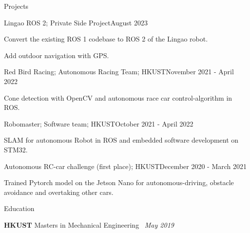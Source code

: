 \documentclass[
	a4paper, %
	11pt, %
]{resume} %
\begin{document}
\begin{rSection}{Projects}

	\begin{rSubsection}{Lingao ROS 2; Private Side Project}{August 2023}{}{}
		\item Convert the existing ROS 1 codebase to ROS 2 of the Lingao robot.
		\item Add outdoor navigation with GPS.
	\end{rSubsection}


	\begin{rSubsection}{Red Bird Racing; Autonomous Racing Team; HKUST}{November 2021 - April 2022}{}{}
		\item Cone detection with OpenCV and autonomous race car control-algorithm in ROS.
	\end{rSubsection}


	\begin{rSubsection}{Robomaster; Software team; HKUST}{October 2021 - April 2022}{}{}
		\item SLAM for autonomous Robot in ROS and embedded software development on STM32.
	\end{rSubsection}


	\begin{rSubsection}{Autonomous RC-car challenge (first place); HKUST}{December 2020 - March 2021}{}{}
		\item Trained Pytorch model on the Jetson Nano for autonomous-driving, obstacle avoidance and overtaking other cars.
	\end{rSubsection}

\end{rSection}



\begin{rSection}{Education}
	
	\textbf{HKUST} Masters in Mechanical Engineering \  \hfill \textit{May 2019}

	
\end{rSection}






\end{document}
